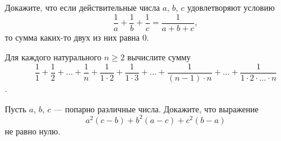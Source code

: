 \documentclass{article}
\begin{document}
\begin{enumerate_boxed}
        \item Докажите, что если действительные числа $a$, $b$, $c$ удовлетворяют условию
        \[\dfrac{1}{a} + \dfrac{1}{b} + \dfrac{1}{c} = \dfrac{1}{a + b + c},\] то сумма каких-то двух из них равна 0.

        \item Для каждого натурального $n \ge 2$ вычислите сумму
        \[\dfrac{1}{1} + \dfrac{1}{2} + \dotso +  \dfrac{1}{n} + \dfrac{1}{1 \cdot 2} + \dfrac{1}{1 \cdot 3} + \dotso +  \dfrac{1}{(n-1) \cdot n} + \dotso + \dfrac{1}{1 \cdot 2 \cdot \dotso \cdot n}\].

        \item Пусть $a$, $b$, $c$ — попарно различные числа.
        Докажите, что выражение
        \[a^2 (c-b)+b^2 (a-c)+c^2 (b-a)\]
        не равно нулю.

    \end{enumerate_boxed}
\end{document}
